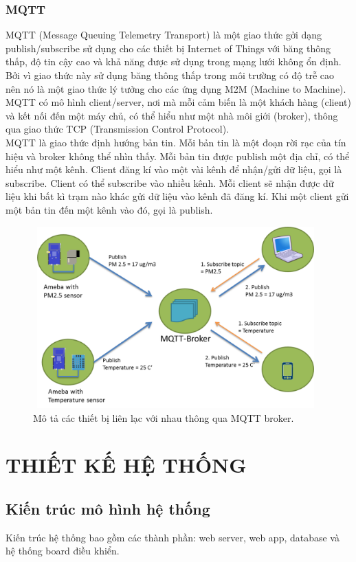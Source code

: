 \documentclass[a4paper,12pt,oneside]{article}
\begin{document}
\subsubsection{MQTT}
\noindent MQTT (Message Queuing Telemetry Transport) là một giao thức gởi dạng publish/subscribe sử dụng cho các thiết bị Internet of Things với băng thông thấp, độ tin cậy cao và khả năng được sử dụng trong mạng lưới không ổn định.
Bởi vì giao thức này sử dụng băng thông thấp trong môi trường có độ trễ cao nên nó là một giao thức lý tưởng cho các ứng dụng M2M (Machine to Machine).\\
 MQTT có mô hình client/server, nơi mà mỗi cảm biến là một khách hàng (client) và kết nối đến một máy chủ, có thể hiểu như một nhà môi giới (broker), thông qua giao thức TCP (Transmission Control Protocol).\\
 MQTT là giao thức định hướng bản tin. Mỗi bản tin là một đoạn rời rạc của tín hiệu và broker không thể nhìn thấy.
Mỗi bản tin được publish một địa chỉ, có thể hiểu như một kênh. Client đăng kí vào một vài kênh để nhận/gửi dữ liệu, gọi là subscribe. Client có thể subscribe vào nhiều kênh. Mỗi client sẽ nhận được dữ liệu khi bất kì trạm nào khác gửi dữ liệu vào kênh đã đăng kí. Khi một client gửi một bản tin đến một kênh vào đó, gọi là publish.

\begin{figure}[H]
	\centering
	\includegraphics[height=7cm,width=11cm]{hinh/mqtt.png}
	\caption{Mô tả các thiết bị liên lạc với nhau thông qua MQTT broker\cite{mqtt}.}
	\label{fig:mqtt}
\end{figure}


\newpage
\section{THIẾT KẾ HỆ THỐNG}
\subsection{Kiến trúc mô hình hệ thống}
\noindent Kiến trúc hệ thống bao gồm các thành phần: web server, web app, database và hệ thống board điều khiển. 
\end{document}
